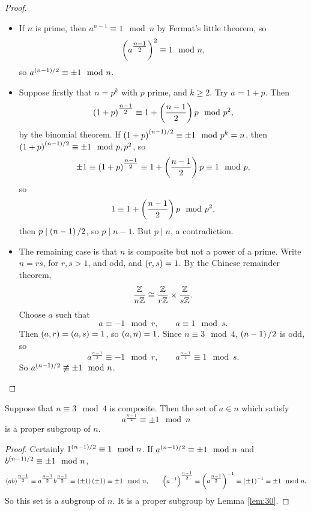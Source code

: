 \begin{proof}
\hfill
\begin{itemize}
\item If $ n $ is prime, then $ a^{n - 1} \equiv 1 \mod n $ by Fermat's little theorem, so
$$ \br{a^{\tfrac{n - 1}{2}}}^2 \equiv 1 \mod n, $$
so $ a^{\br{n - 1} / 2} \equiv \pm 1 \mod n $.
\item Suppose firstly that $ n = p^k $ with $ p $ prime, and $ k \ge 2 $. Try $ a = 1 + p $. Then
$$ \br{1 + p}^{\tfrac{n - 1}{2}} \equiv 1 + \br{\dfrac{n - 1}{2}}p \mod p^2, $$
by the binomial theorem. If $ \br{1 + p}^{\br{n - 1} / 2} \equiv \pm 1 \mod p^k = n $, then $ \br{1 + p}^{\br{n - 1} / 2} \equiv \pm 1 \mod p, p^2 $, so
$$ \pm 1 \equiv \br{1 + p}^{\tfrac{n - 1}{2}} \equiv 1 + \br{\dfrac{n - 1}{2}}p \equiv 1 \mod p, $$
so
$$ 1 \equiv 1 + \br{\dfrac{n - 1}{2}}p \mod p^2, $$
then $ p \mid \br{n - 1} / 2 $, so $ p \mid n - 1 $. But $ p \mid n $, a contradiction.
\item The remaining case is that $ n $ is composite but not a power of a prime. Write $ n = rs $, for $ r, s > 1 $, and odd, and $ \br{r, s} = 1 $. By the Chinese remainder theorem,
$$ \dfrac{\mathbb{Z}}{n\mathbb{Z}} \cong \dfrac{\mathbb{Z}}{r\mathbb{Z}} \times \dfrac{\mathbb{Z}}{s\mathbb{Z}}. $$
Choose $ a $ such that
$$ a \equiv -1 \mod r, \qquad a \equiv 1 \mod s. $$
Then $ \br{a, r} = \br{a, s} = 1 $, so $ \br{a, n} = 1 $. Since $ n \equiv 3 \mod 4 $, $ \br{n - 1} / 2 $ is odd, so
$$ a^{\tfrac{n - 1}{2}} \equiv -1 \mod r, \qquad a^{\tfrac{n - 1}{2}} \equiv 1 \mod s. $$
So $ a^{\br{n - 1} / 2} \not\equiv \pm 1 \mod n $.
\end{itemize}
\end{proof}

\pagebreak

\begin{lemma}
\label{lem:31}
Suppose that $ n \equiv 3 \mod 4 $ is composite. Then the set of $ a \in \unit{n} $ which satisfy
$$ a^{\tfrac{n - 1}{2}} \equiv \pm 1 \mod n $$
is a proper subgroup of $ \unit{n} $.
\end{lemma}

\begin{proof}
Certainly $ 1^{\br{n - 1} / 2} \equiv 1 \mod n $. If $ a^{\br{n - 1} / 2} \equiv \pm 1 \mod n $ and $ b^{\br{n - 1} / 2} \equiv \pm 1 \mod n $,
$$ \br{ab}^{\tfrac{n - 1}{2}} \equiv a^{\tfrac{n - 1}{2}}b^{\tfrac{n - 1}{2}} \equiv \br{\pm 1}\br{\pm 1} \equiv \pm 1 \mod n, \qquad \br{a^{-1}}^{\tfrac{n - 1}{2}} \equiv \br{a^{\tfrac{n - 1}{2}}}^{-1} \equiv \br{\pm 1}^{-1} \equiv \pm 1 \mod n. $$
So this set is a subgroup of $ \unit{n} $. It is a proper subgroup by Lemma \ref{lem:30}.
\end{proof}

